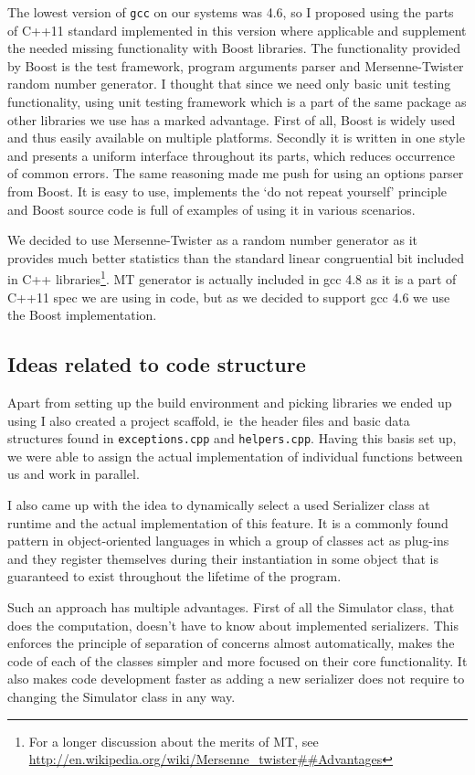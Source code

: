 \documentclass[11pt,a4paper]{article}
\begin{document}
The lowest version of \texttt{gcc} on our systems was 4.6, so I proposed using the parts of C++11 standard implemented in this version where applicable and supplement the needed missing functionality with Boost libraries. 
The functionality provided by Boost is the test framework, program arguments parser and Mersenne-Twister random number generator. I thought that since we need only basic unit testing functionality, using unit testing framework which is a part of the same package as other libraries we use has a marked advantage. First of all, Boost is widely used and thus easily available on multiple platforms. Secondly it is written in one style and presents a uniform interface throughout its parts, which reduces occurrence of common errors. 
The same reasoning made me push for using an options parser from Boost. It is easy to use, implements the `do not repeat yourself' principle and Boost source code is full of examples of using it in various scenarios. 

We decided to use Mersenne-Twister as a random number generator as it provides much better statistics than the standard linear congruential bit included in C++ libraries\footnote{For a longer discussion about the merits of MT, see \url{http://en.wikipedia.org/wiki/Mersenne_twister##Advantages}}. MT generator is actually included in gcc 4.8 as it is a part of C++11 spec we are using in code, but as we decided to support gcc 4.6 we use the Boost implementation.

\subsection{Ideas related to code structure}\label{ideas}
Apart from setting up the build environment and picking libraries we ended up using I also created a project scaffold, ie\  the header files and basic data structures found in \texttt{exceptions.cpp} and \texttt{helpers.cpp}. Having this basis set up, we were able to assign the actual implementation of individual functions between us and work in parallel. 

I also came up with the idea to dynamically select a used Serializer class at runtime and the actual implementation of this feature. It is a commonly found pattern in object-oriented languages in which a group of classes act as plug-ins and they register themselves during their instantiation in some object that is guaranteed to exist throughout the lifetime of the program. 

Such an approach has multiple advantages. First of all the Simulator class, that does the computation, doesn't have to know about implemented serializers. This enforces the principle of separation of concerns almost automatically, makes the code of each of the classes simpler and more focused on their core functionality. It also makes code development faster as adding a new serializer does not require to changing the Simulator class in any way.
\end{document}
